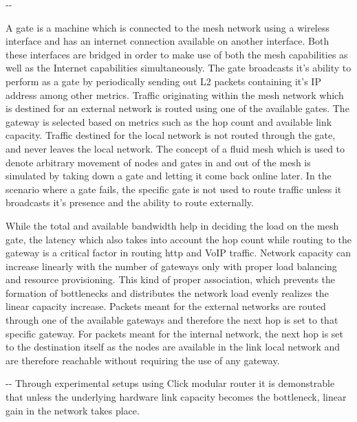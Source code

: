 \documentclass[12pt]{article}
\makeatletter
\newenvironment{indentation}[3]%
	{\par\setlength{\parindent}{#3}
	\setlength{\leftmargin}{#1}       \setlength{\rightmargin}{#1}%
	\advance\linewidth -\leftmargin       \advance\linewidth -\rightmargin%
	\advance\@totalleftmargin\leftmargin  \@setpar{{\@@par}}%
	\parshape 1\@totalleftmargin \linewidth\ignorespaces}{\par}%
\makeatother
\begin{document}
\begin{indentation}{0pt}{0pt}{0pt}
  {\normalsize \hspace{1cm} A gate is a machine which is connected to the mesh network using a wireless interface and has an internet connection available on another interface. Both these interfaces are bridged in order to make use of both the mesh capabilities as well as the Internet capabilities simultaneously. The gate broadcasts it's ability to perform as a gate by periodically sending out L2 packets containing it's IP address among other metrics. Traffic originating within the mesh network which is destined for an external network is routed using one of the available gates. The gateway is selected based on metrics such as the hop count and available link capacity. Traffic destined for the local network is not routed through the gate, and never leaves the local network. The concept of a fluid mesh which is used to denote arbitrary movement of nodes and gates in and out of the mesh is simulated by taking down a gate and letting it come back online later. In the scenario where a gate fails, the specific gate is not used to route traffic unless it broadcasts it's presence and the ability to route externally.

While the total and available bandwidth help in deciding the load on the mesh gate, the latency which also takes into account the hop count while routing to the gateway is a critical factor in routing http and VoIP traffic. Network capacity can increase linearly with the number of gateways only with proper load balancing and resource provisioning. This kind of proper association, which prevents the formation of bottlenecks and distributes the network load evenly realizes the linear capacity increase. Packets meant for the external networks are routed through one of the available gateways and therefore the next hop is set to that specific gateway. For packets meant for the internal network, the next hop is set to the destination itself as the nodes are available in the link local network and are therefore reachable without requiring the use of any gateway.}
\end{indentation}


\begin{indentation}{0pt}{0pt}{0pt}
{\normalsize \hspace{1cm} Through experimental setups using Click modular router it is demonstrable that unless the underlying hardware link capacity becomes the bottleneck, linear gain in the network takes place.}
\end{indentation}
\end{document}
